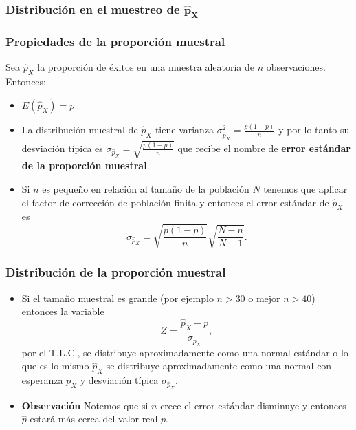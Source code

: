     \subsubsection{Distribución en el muestreo de  $\mathbf{\hat{p}_{X}}$}

\begin{frame}
\frametitle{Propiedades de la proporción muestral}
    Sea   $\hat{p}_{X}$ la proporción de éxitos en una muestra
    aleatoria de $n$ observaciones. Entonces:

    \begin{itemize}
    \item  $E(\hat{p}_{X})=p$
    \item  La distribución muestral de $\hat{p}_{X}$  tiene
    varianza $\sigma_{\hat{p}_{X}}^2=\frac{p(1-p)}{n}$ y por lo tanto su desviación
    típica es
    $\sigma_{\hat{p}_{X} }=\sqrt{\frac{p(1-p)}{n}}$
    que recibe el nombre de \textbf{error estándar de la proporción
    muestral}.
    \item Si $n$ es pequeño en relación al tamaño de la población $N$
    tenemos que aplicar el factor de corrección de población finita
  y entonces el error estándar de  $\hat{p}_{X}$  es
    $$\sigma_{\hat{p}_{X} }=\sqrt{\frac{p(1-p)}{n}}
  \sqrt{\frac{N-n}{N-1}}.$$
\end{itemize}
\end{frame}

\begin{frame}
\frametitle{Distribución de la proporción muestral}
\begin{itemize}
  \item Si el tamaño muestral es grande (por ejemplo $n>30$ o mejor  $n>40$) entonces la variable
  $$Z=\frac{\hat{p}_{X}- p}{\sigma_{\hat{p}_{X}}},$$
  por el T.L.C., se distribuye aproximadamente como una normal estándar
  o lo que es lo mismo $\hat{p}_{X}$ se distribuye aproximadamente
  como una normal con esperanza $p_{X}$ y desviación típica
  $\sigma_{\hat{p}_{X}}$.
 
 \item \textbf{Observación} Notemos que si $n$ crece el error estándar
    disminuye y entonces $\hat{p}$ estará más cerca del valor real $p$.
\end{itemize}
\end{frame}

